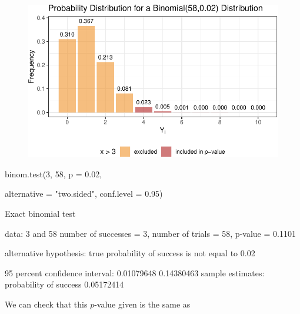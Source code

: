 \documentclass[
  letterpaper,
  DIV=11,
  numbers=noendperiod]{scrreport}
\newenvironment{Shaded}{\begin{snugshade}}{\end{snugshade}}
\newcommand{\AttributeTok}[1]{\textcolor[rgb]{0.40,0.45,0.13}{#1}}
\newcommand{\DecValTok}[1]{\textcolor[rgb]{0.68,0.00,0.00}{#1}}
\newcommand{\FloatTok}[1]{\textcolor[rgb]{0.68,0.00,0.00}{#1}}
\newcommand{\FunctionTok}[1]{\textcolor[rgb]{0.28,0.35,0.67}{#1}}
\newcommand{\NormalTok}[1]{\textcolor[rgb]{0.00,0.23,0.31}{#1}}
\newcommand{\OtherTok}[1]{\textcolor[rgb]{0.00,0.23,0.31}{#1}}
\newcommand{\SpecialCharTok}[1]{\textcolor[rgb]{0.37,0.37,0.37}{#1}}
\newcommand{\StringTok}[1]{\textcolor[rgb]{0.13,0.47,0.30}{#1}}
\begin{document}
\begin{figure}[H]

{\centering \includegraphics{week8/week8_files/figure-pdf/unnamed-chunk-6-1.pdf}

}

\end{figure}

\begin{Shaded}
\begin{Highlighting}[]
\FunctionTok{binom.test}\NormalTok{(}\DecValTok{3}\NormalTok{, }\DecValTok{58}\NormalTok{, }\AttributeTok{p =} \FloatTok{0.02}\NormalTok{,}

        \AttributeTok{alternative =} \StringTok{"two.sided"}\NormalTok{,}
        \AttributeTok{conf.level =} \FloatTok{0.95}\NormalTok{)}

\NormalTok{    Exact binomial test}

\NormalTok{data}\SpecialCharTok{:} \DecValTok{3}\NormalTok{ and }\DecValTok{58}
\NormalTok{number of successes }\OtherTok{=} \DecValTok{3}\NormalTok{, number of trials }\OtherTok{=} \DecValTok{58}\NormalTok{,}
\NormalTok{p}\SpecialCharTok{{-}}\NormalTok{value }\OtherTok{=} \FloatTok{0.1101}

\NormalTok{alternative hypothesis}\SpecialCharTok{:}\NormalTok{ true probability of success}
\NormalTok{is not equal to }\FloatTok{0.02}

\DecValTok{95}\NormalTok{ percent confidence interval}\SpecialCharTok{:}
\FloatTok{0.01079648} \FloatTok{0.14380463}
\NormalTok{sample estimates}\SpecialCharTok{:}
\NormalTok{probability of success}
            \FloatTok{0.05172414}
\end{Highlighting}
\end{Shaded}

We can check that this \(p\)-value given is the same as
\end{document}
